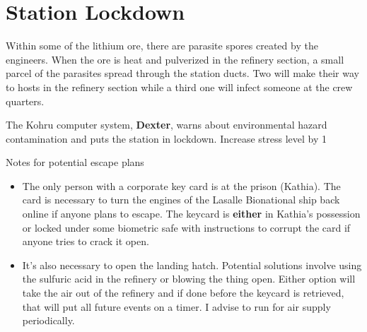 \newsect

\section{Station Lockdown}



\begin{rpg-commentbox}{}
    
    Within some of the lithium ore, there are parasite spores created by the engineers. When the ore is heat and pulverized in the refinery section, a small parcel of the parasites spread through the station ducts. Two will make their way to hosts in the refinery section while a third one will infect someone at the crew quarters. 
    
    The Kohru computer system, \textbf{Dexter}, warns about environmental hazard contamination and puts the station in lockdown. Increase stress level by 1
\end{rpg-commentbox}    


\medskip
\begin{rpg-commentbox}{Notes for potential escape plans}
\begin{itemize}
    \item The only person with a corporate key card is at the prison (Kathia). The card is necessary to turn the engines of the Lasalle Bionational ship back online if anyone plans to escape. The keycard is \textbf{either} in Kathia's possession or locked under some biometric safe with instructions to corrupt the card if anyone tries to crack it open. 

    \item It's also necessary to open the landing hatch. Potential solutions involve using the sulfuric acid in the refinery or blowing the thing open. Either option will take the air out of the refinery and if done before the keycard is retrieved, that will put all future events on a timer. I advise to run for air supply periodically.
\end{itemize}
\end{rpg-commentbox}



    


\newsect

